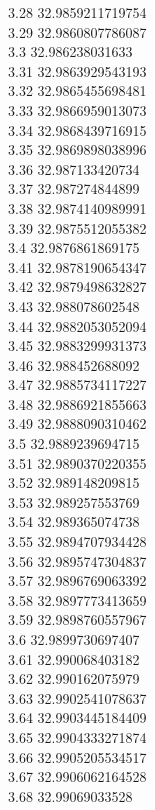 {3.28	32.9859211719754\\
3.29	32.9860807786087\\
3.3	32.986238031633\\
3.31	32.9863929543193\\
3.32	32.9865455698481\\
3.33	32.9866959013073\\
3.34	32.9868439716915\\
3.35	32.9869898038996\\
3.36	32.987133420734\\
3.37	32.987274844899\\
3.38	32.9874140989991\\
3.39	32.9875512055382\\
3.4	32.9876861869175\\
3.41	32.9878190654347\\
3.42	32.9879498632827\\
3.43	32.988078602548\\
3.44	32.9882053052094\\
3.45	32.9883299931373\\
3.46	32.988452688092\\
3.47	32.9885734117227\\
3.48	32.9886921855663\\
3.49	32.9888090310462\\
3.5	32.9889239694715\\
3.51	32.9890370220355\\
3.52	32.989148209815\\
3.53	32.989257553769\\
3.54	32.989365074738\\
3.55	32.9894707934428\\
3.56	32.9895747304837\\
3.57	32.9896769063392\\
3.58	32.9897773413659\\
3.59	32.9898760557967\\
3.6	32.9899730697407\\
3.61	32.990068403182\\
3.62	32.990162075979\\
3.63	32.9902541078637\\
3.64	32.9903445184409\\
3.65	32.9904333271874\\
3.66	32.9905205534517\\
3.67	32.9906062164528\\
3.68	32.99069033528\\
}
